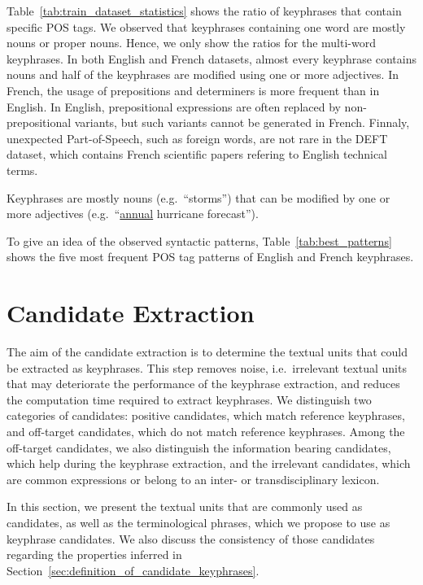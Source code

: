     Table~\ref{tab:train_dataset_statistics} shows the ratio of keyphrases that
    contain specific POS tags. We observed that keyphrases containing one word
    are mostly nouns or proper nouns. Hence, we only show the ratios for the
    multi-word keyphrases. In both English and French datasets, almost every
    keyphrase contains nouns and half of the keyphrases are modified using one
    or more adjectives. In French, the usage of prepositions and determiners is 
    more frequent than in English. In English, prepositional expressions are
    often replaced by non-prepositional variants, but such variants cannot be
    generated in French. Finnaly, unexpected Part-of-Speech, such as foreign
    words, are not rare in the DEFT dataset, which contains French scientific
    papers refering to English technical terms.

    \begin{property}\label{prop:noun_phrases}
      Keyphrases are mostly nouns (e.g.~``storms'') that can be modified by one
      or more adjectives (e.g.~``\underline{annual} hurricane forecast'').
    \end{property}

    To give an idea of the observed syntactic patterns,
    Table~\ref{tab:best_patterns} shows the five most frequent POS tag patterns
    of English and French keyphrases.

\section{Candidate Extraction}
\label{sec:candidate_extraction}
  The aim of the candidate extraction is to determine the textual units that
  could be extracted as keyphrases. This step removes noise, i.e.~irrelevant
  textual units that may deteriorate the performance of the keyphrase
  extraction, and reduces the computation time required to extract  keyphrases.
  We distinguish two categories of candidates: positive candidates, which match
  reference keyphrases, and off-target candidates, which do not match reference
  keyphrases. Among the off-target candidates, we also distinguish the
  information bearing candidates, which help during the keyphrase extraction,
  and the irrelevant candidates, which are common expressions or belong to an
  inter- or transdisciplinary lexicon.

  In this section, we present the textual units that are commonly used as
  candidates, as well as the terminological phrases, which we propose to use as
  keyphrase candidates. We also discuss the consistency of those candidates
  regarding the properties inferred in
  Section~\ref{sec:definition_of_candidate_keyphrases}.

